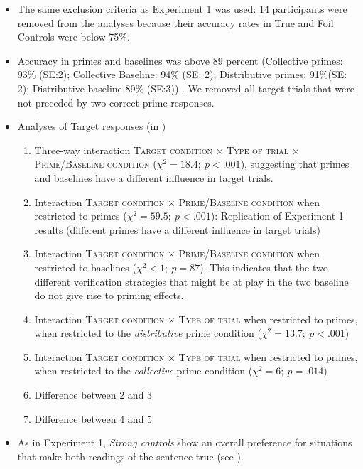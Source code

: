 \documentclass[a4paper, 11pt]{article}
\begin{document}
\begin{itemize}
\item The same exclusion criteria as Experiment 1 was used: 14 participants were removed from the analyses because their accuracy rates in True and Foil Controls were below 75\%. 

\item Accuracy in primes and baselines was above 89 percent (Collective primes: 93\% (SE:2); Collective Baseline: 94\% (SE: 2); Distributive primes: 91\%(SE: 2); Distributive baseline 89\% (SE:3)) . We removed all target trials that were not preceded by two correct prime responses. 

\item Analyses of Target responses (in )
\begin{enumerate}
\item Three-way interaction \textsc{Target condition} $\times$ \textsc{Type of trial} $\times$ \textsc{Prime/Baseline condition} ($\chi^{2}=18.4; \ p<.001$), suggesting that primes and baselines have a different influence in target trials.
\item Interaction \textsc{Target condition} $\times$ \textsc{Prime/Baseline condition} when restricted to primes ($\chi^{2}=59.5;\  p<.001$): Replication of Experiment 1 results (different primes have a different influence in target trials)
\item Interaction \textsc{Target condition} $\times$ \textsc{Prime/Baseline condition} when restricted to baselines ($\chi^{2}<1; \ p=87$). This indicates that the two different verification strategies that might be at play in the two baseline do not give rise to priming effects. 
\item Interaction \textsc{Target condition} $\times$ \textsc{Type of trial} when restricted to primes, when restricted to the \emph{distributive} prime condition ($\chi^{2}=13.7; \ p<.001$)
\item Interaction \textsc{Target condition} $\times$ \textsc{Type of trial} when restricted to primes, when restricted to the \emph{collective} prime condition ($\chi^{2}=6; \ p=.014$)
\item Difference between 2 and 3
\item Difference between 4 and 5

\end{enumerate}

\item As in Experiment 1, \textit{Strong controls} show an overall preference for situations that make both readings of the sentence true (see ). 

\end{itemize}
\end{document}
